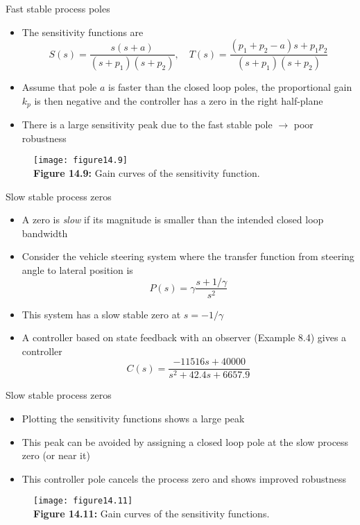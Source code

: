 \documentclass{beamer-control}
\begin{document}
\begin{frame}{Fast stable process poles}
	\begin{itemize}
		\item The sensitivity functions are 
		\[S(s) = \frac{s(s+a)}{(s+p_1)(s+p_2)}, \quad T(s) = \frac{(p_1+p_2-a)s+p_1p_2}{(s+p_1)(s+p_2)}\]
		\item Assume that pole $a$ is faster than the closed loop poles, the proportional gain $k_p$ is then negative and the controller has a zero in the right half-plane
		\item There is a large sensitivity peak due to the fast stable pole $\rightarrow$ poor robustness
	\end{itemize}
\begin{figure}
	\vspace{-0.5cm}
	\centering
	\texttt{[image: figure14.9]}\\
	\vspace{-0.2cm}
	\textbf{Figure 14.9:} Gain curves of the sensitivity function.
\end{figure}
\end{frame}


\begin{frame}{Slow stable process zeros}
	\begin{itemize}
		\item A zero is \textit{slow} if its magnitude is smaller than the intended closed loop bandwidth
		\item Consider the vehicle steering system where the transfer function from steering angle to lateral position is 
		\[P(s)=\gamma \frac{s+1/\gamma}{s^2}\]
		\item This system has a slow stable zero at $s=-1/\gamma$
		\item A controller based on state feedback with an observer (Example 8.4) gives a controller 
		\[C(s) = \frac{-11516s+40000}{s^2+42.4s+6657.9}\]
	\end{itemize}
\end{frame}


\begin{frame}{Slow stable process zeros}
	\begin{itemize}
		\item Plotting the sensitivity functions shows a large peak 
		\item This peak can be avoided by assigning a closed loop pole at the slow process zero (or near it)
		\item This controller pole cancels the process zero and shows improved robustness
	\end{itemize}
	\begin{figure}
		\centering
		\texttt{[image: figure14.11]}\\
		\vspace{-0.2cm}
		\textbf{Figure 14.11:} Gain curves of the sensitivity functions.
	\end{figure}
\end{frame}
\end{document}
